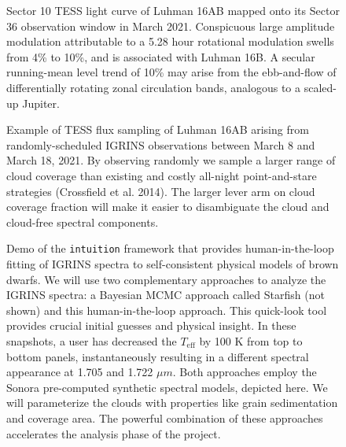 \documentclass[11pt]{article}
\begin{document}
{\begin{figure}[ht!]
    \caption{Sector 10 TESS light curve of Luhman 16AB mapped onto its Sector 36 observation window in March 2021.  Conspicuous large amplitude modulation attributable to a 5.28 hour rotational modulation swells from 4\% to 10\%, and is associated with Luhman 16B.  A secular running-mean level trend of 10\% may arise from the ebb-and-flow of differentially rotating zonal circulation bands, analogous to a scaled-up Jupiter.}
\end{figure}

 
\begin{figure}[ht!]
    \caption{Example of TESS flux sampling of Luhman 16AB arising from randomly-scheduled IGRINS observations between March 8 and March 18, 2021.  By observing randomly we sample a larger range of cloud coverage than existing and costly all-night point-and-stare strategies (Crossfield et al. 2014).  The larger lever arm on cloud coverage fraction will make it easier to disambiguate the cloud and cloud-free spectral components.}
\end{figure}
    

 
\begin{figure}[ht!]

    \caption{Demo of the \texttt{intuition} framework that provides human-in-the-loop fitting of IGRINS spectra to self-consistent physical models of brown dwarfs.  We will use two complementary approaches to analyze the IGRINS spectra: a Bayesian MCMC approach called Starfish (not shown) and this human-in-the-loop approach.  This quick-look tool provides crucial initial guesses and physical insight.  In these snapshots, a user has decreased the $T_{\mathrm{eff}}$ by 100 K from top to bottom panels, instantaneously resulting in a different spectral appearance at 1.705 and 1.722 $\mu m$.  Both approaches employ the Sonora pre-computed synthetic spectral models, depicted here.  We will parameterize the clouds with properties like grain sedimentation and coverage area.  The powerful combination of these approaches accelerates the analysis phase of the project.}
\end{figure}

}
\end{document}
